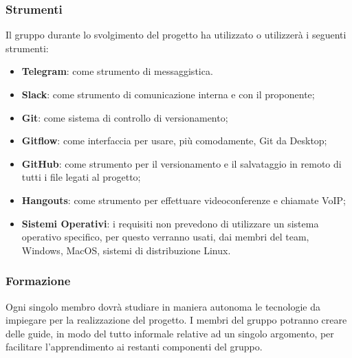    			
   			
   		\subsubsection{Strumenti}
   			Il gruppo durante lo svolgimento del progetto ha utilizzato o utilizzerà i seguenti strumenti:
   			\begin{itemize}
   				\item \textbf{Telegram}: come strumento di messaggistica.
   				\item \textbf{Slack}: come strumento di comunicazione interna e con il proponente;
   				\item \textbf{Git}: come sistema di controllo di versionamento;
   				\item \textbf{Gitflow}: come interfaccia per usare, più comodamente, Git da Desktop;
   				\item \textbf{GitHub}: come strumento per il versionamento e il salvataggio in remoto di tutti i file legati al progetto;
   				\item \textbf{Hangouts}: come strumento per effettuare videoconferenze e chiamate VoIP;
   				\item \textbf{Sistemi Operativi}: i requisiti non prevedono di utilizzare un sistema operativo specifico, per questo verranno usati, dai membri del team, Windows, MacOS, sistemi di distribuzione Linux.
   			\end{itemize}
   		\subsubsection{Formazione}
   			Ogni singolo membro dovrà studiare in maniera autonoma le tecnologie da impiegare per la realizzazione del progetto. I membri del gruppo potranno creare delle guide, in modo del tutto informale relative ad un singolo argomento, per facilitare l'apprendimento ai restanti componenti del gruppo.

